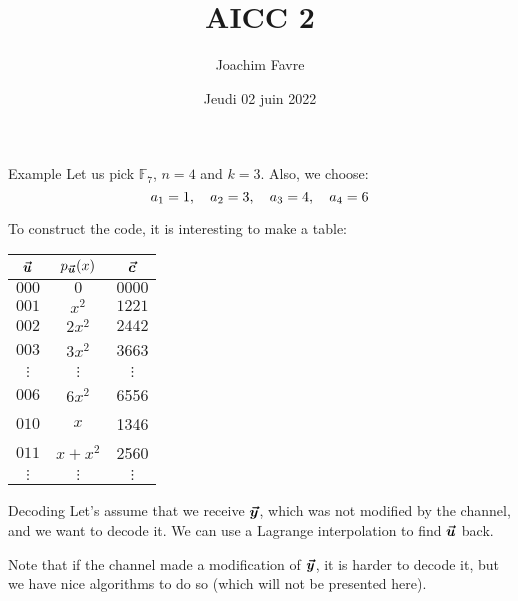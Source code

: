 \documentclass[a4paper]{article}
\title{AICC 2}
\author{Joachim Favre}
\date{Jeudi 02 juin 2022}
\begin{document}
\maketitle


\begin{parag}{Example}
    Let us pick $\mathbb{F}_7$, $n = 4$ and $k = 3$. Also, we choose: 
    \[a_1 = 1, \quad a_2 = 3, \quad a_3 = 4, \quad a_4 = 6\]
    

    To construct the code, it is interesting to make a table:
    \begin{center}
    \begin{tabular}{c|c|c}
        $\bm{\protect\vec{u}}$ & $p_{\bvec{u}}\left(x\right)$ & $\bm{\protect\vec{c}}$ \\
        \hline
        $000$ & $0$ & $0000$ \\
        $001$ & $x^2$ & $1221$ \\
        $002$ & $2x^2$ & $2442$\\
        $003$ & $3x^2$ & 3663\\
        $\vdots$ & $\vdots$ & $\vdots$\\
        $006$ & $6x^2$ & 6556\\
        $010$ & $x$ & 1346\\
        $011$ & $x + x^2$ & 2560\\
        $\vdots$ & $\vdots$ & $\vdots$
    \end{tabular}
    \end{center}
\end{parag}

\begin{parag}{Decoding}
    Let's assume that we receive $\bm{\protect\vec{y}}$, which was not modified by the channel, and we want to decode it. We can use a Lagrange interpolation to find $\bm{\protect\vec{u}}$ back.

    Note that if the channel made a modification of $\bm{\protect\vec{y}}$, it is harder to decode it, but we have nice algorithms to do so (which will not be presented here).
\end{parag}
\end{document}
